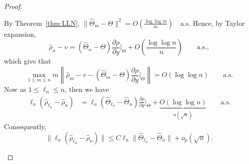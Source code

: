 \begin{proof}
\begin{enumerate}[label=(\roman*)]
		
By Theorem~\ref{thm:LLN},
\(
\|\hat\Theta_m-\Theta\|^2
=O\!\left(\frac{\log\log m}{m}\right)
\quad\text{a.s.}
\)
Hence, by Taylor expansion,
\[
\hat\rho_n-v
=(\hat\Theta_n-\Theta)\frac{\partial\rho}{\partial y}\Big|_\Theta
+O\!\left(\frac{\log\log n}{n}\right)
\qquad\text{a.s.},
\]
which give that
\[
\max_{1\leq m\leq n}
 m\left\|\hat\rho_m-v
 -(\hat\Theta_m-\Theta)\frac{\partial\rho}{\partial y}\Big|_\Theta\right\|
=O(\log\log n)\qquad\text{a.s.}
\]
Now as \(1\leq\ell_n\leq n\), then we have
\begin{align*}
\ell_n(\hat\rho_{\ell_n}-\hat\rho_n)
&=\ell_n(\hat\Theta_{\ell_n}-\hat\Theta_n)
\frac{\partial\rho}{\partial y}\Big|_\Theta
+\underbrace{O(\log\log n)}_{o(\sqrt n)}
\qquad\text{a.s.}
\end{align*}
Consequently,
\[
\|\ell_n(\hat\rho_{\ell_n}-\hat\rho_n)\|
\leq C\ell_n\|\hat\Theta_{\ell_n}-\hat\Theta_n\|
+o_p(\sqrt n).
\]



\end{enumerate}
\end{proof}
